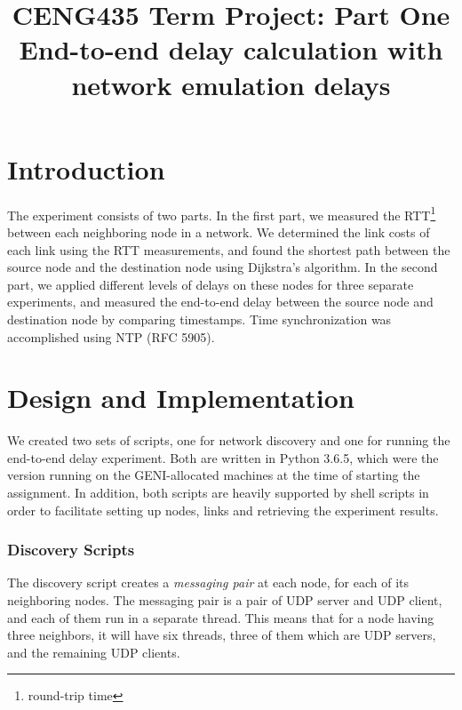 \documentclass[conference]{IEEEtran}
\begin{document}
\title{%
  CENG435 Term Project: Part One \\
  \large End-to-end delay calculation with network emulation delays}

\author{
    \IEEEauthorblockA{}
\and
    \IEEEauthorblockA{}
}

\maketitle

\section{Introduction}
The experiment consists of two parts. In the first part, we measured the RTT\footnote{round-trip time}
between each neighboring node in a network. We determined the link costs of each link using the RTT
measurements, and found the shortest path between the source node and the destination node using
Dijkstra's algorithm. In the second part, we applied different levels of delays on these nodes for
three separate experiments, and measured the end-to-end delay between the source node and destination
node by comparing timestamps. Time synchronization was accomplished using NTP (RFC 5905).

\section{Design and Implementation}
We created two sets of scripts, one for network discovery and one for running the end-to-end delay
experiment. Both are written in Python 3.6.5, which were the version running on the GENI-allocated
machines at the time of starting the assignment. In addition, both scripts are heavily supported by
shell scripts in order to facilitate setting up nodes, links and retrieving the experiment results.


\subsubsection{Discovery Scripts}
The discovery script creates a \textit{messaging pair} at each node, for each of its
neighboring nodes. The messaging pair is a pair of UDP server and UDP client, and each of them
run in a separate thread. This means that for a node having three neighbors, it will have six
threads, three of them which are UDP servers, and the remaining UDP clients.
\end{document}
